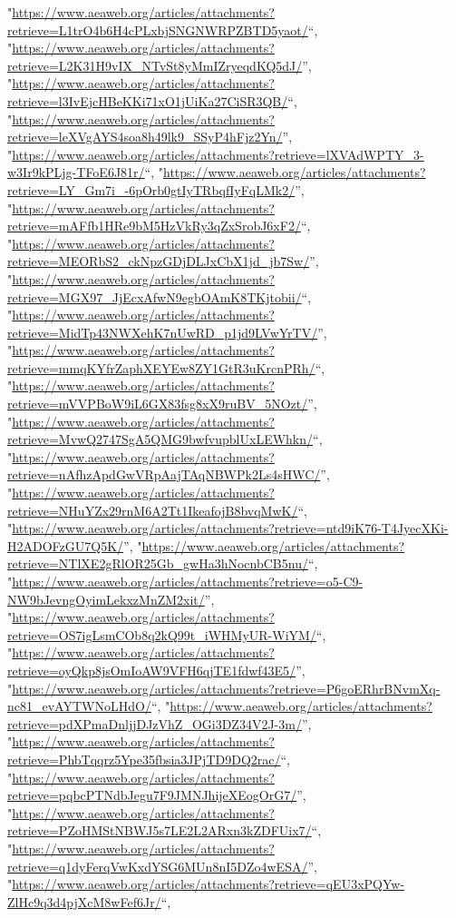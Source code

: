 \documentclass[]{article}
\begin{document}
\begin{itemize}
  "\url{https://www.aeaweb.org/articles/attachments?retrieve=L1trO4b6H4cPLxbjSNGNWRPZBTD5yaot/}``,
  "\url{https://www.aeaweb.org/articles/attachments?retrieve=L2K31H9vIX_NTvSt8yMmIZryeqdKQ5dJ/}'',
  "\url{https://www.aeaweb.org/articles/attachments?retrieve=l3IvEjcHBeKKi71xO1jUiKa27CiSR3QB/}``,
  "\url{https://www.aeaweb.org/articles/attachments?retrieve=leXVgAYS4soa8h49lk9_SSyP4hFjz2Yn/}'',
  "\url{https://www.aeaweb.org/articles/attachments?retrieve=lXVAdWPTY_3-w3Ir9kPLjg-TFoE6J81r/}``,
  "\url{https://www.aeaweb.org/articles/attachments?retrieve=LY_Gm7i_-6pOrb0gtIyTRbqfIyFqLMk2/}'',
  "\url{https://www.aeaweb.org/articles/attachments?retrieve=mAFfb1HRe9bM5HzVkRy3qZxSrobJ6xF2/}``,
  "\url{https://www.aeaweb.org/articles/attachments?retrieve=MEORbS2_ckNpzGDjDLJxCbX1jd_jb7Sw/}'',
  "\url{https://www.aeaweb.org/articles/attachments?retrieve=MGX97_JjEcxAfwN9egbOAmK8TKjtobii/}``,
  "\url{https://www.aeaweb.org/articles/attachments?retrieve=MidTp43NWXehK7nUwRD_p1jd9LVwYrTV/}'',
  "\url{https://www.aeaweb.org/articles/attachments?retrieve=mmqKYfrZaphXEYEw8ZY1GtR3uKrcnPRh/}``,
  "\url{https://www.aeaweb.org/articles/attachments?retrieve=mVVPBoW9iL6GX83fsg8xX9ruBV_5NOzt/}'',
  "\url{https://www.aeaweb.org/articles/attachments?retrieve=MvwQ2747SgA5QMG9bwfvupblUxLEWhkn/}``,
  "\url{https://www.aeaweb.org/articles/attachments?retrieve=nAfhzApdGwVRpAajTAqNBWPk2Ls4sHWC/}'',
  "\url{https://www.aeaweb.org/articles/attachments?retrieve=NHuYZx29rnM6A2Tt1IkeafojB8bvqMwK/}``,
  "\url{https://www.aeaweb.org/articles/attachments?retrieve=ntd9iK76-T4JyecXKi-H2ADOFzGU7Q5K/}'',
  "\url{https://www.aeaweb.org/articles/attachments?retrieve=NTlXE2gRlOR25Gb_gwHa3hNocnbCB5nu/}``,
  "\url{https://www.aeaweb.org/articles/attachments?retrieve=o5-C9-NW9bJevngOyimLekxzMnZM2xit/}'',
  "\url{https://www.aeaweb.org/articles/attachments?retrieve=OS7igLsmCOb8q2kQ99t_iWHMyUR-WiYM/}``,
  "\url{https://www.aeaweb.org/articles/attachments?retrieve=oyQkp8jsOmIoAW9VFH6qjTE1fdwf43E5/}'',
  "\url{https://www.aeaweb.org/articles/attachments?retrieve=P6goERhrBNvmXq-nc81_evAYTWNoLHdO/}``,
  "\url{https://www.aeaweb.org/articles/attachments?retrieve=pdXPmaDnljjDJzVhZ_OGi3DZ34V2J-3m/}'',
  "\url{https://www.aeaweb.org/articles/attachments?retrieve=PhbTqqrz5Ype35fbsia3JPjTD9DQ2rac/}``,
  "\url{https://www.aeaweb.org/articles/attachments?retrieve=pqbcPTNdbJegu7F9JMNJhijeXEogOrG7/}'',
  "\url{https://www.aeaweb.org/articles/attachments?retrieve=PZoHMStNBWJ5s7LE2L2ARxn3kZDFUix7/}``,
  "\url{https://www.aeaweb.org/articles/attachments?retrieve=q1dyFerqVwKxdYSG6MUn8nI5DZo4wESA/}'',
  "\url{https://www.aeaweb.org/articles/attachments?retrieve=qEU3xPQYw-ZlHc9q3d4pjXcM8wFef6Jr/}``,

\end{itemize}
\end{document}

